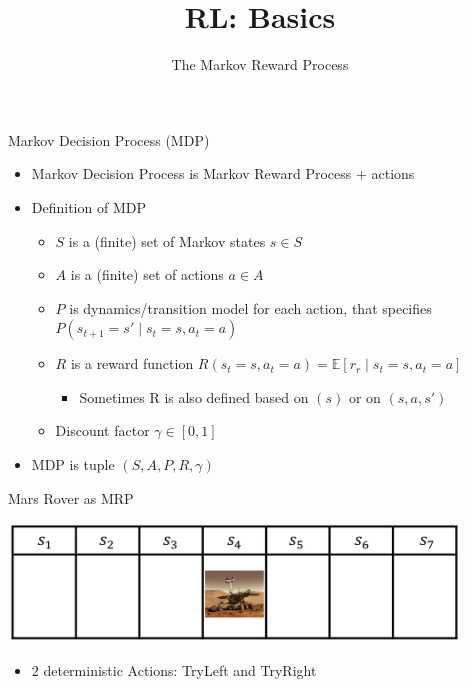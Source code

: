 


\title[Reinforcement Learning: Basics]{RL: Basics}
\subtitle{The Markov Reward Process}




	
	\maketitle

\begin{frame}[c]{Markov Decision Process (MDP)}

\begin{itemize}
	\item Markov Decision Process is Markov Reward Process + actions
	\item Definition of MDP
	\begin{itemize}
		\item $S$ is a (finite) set of Markov states $s \in S$
		\item $A$ is a (finite) set of actions $a \in A$
		\item $P$ is dynamics/transition model for each action, that specifies $P(s_{t+1} = s' \mid s_t=s, a_t=a)$
		\item $R$ is a reward function 
		$R(s_t=s, a_t=a) = \mathbb{E}[r_r \mid s_t=s, a_t=a] $
		\begin{itemize}
			\item Sometimes R is also defined based on $(s)$ or on $(s,a,s')$
		\end{itemize}
		\item Discount factor $\gamma \in [0, 1]$
	\end{itemize}
	\item MDP is tuple $(S,A,P, R, \gamma)$
\end{itemize}

\end{frame}
\begin{frame}[c]{Mars Rover as MRP}

\begin{center}
	\includegraphics[width=0.9\textwidth]{images/mars_rover.png}
\end{center}

\begin{itemize}
	\item $2$ deterministic Actions: TryLeft and TryRight
\end{itemize}



\end{frame}
